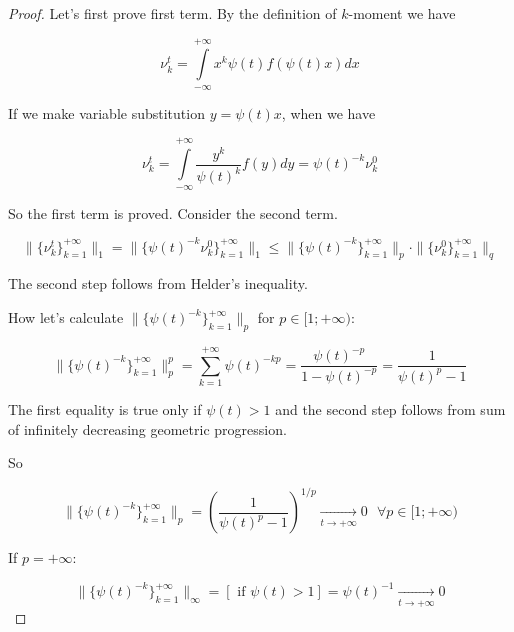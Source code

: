 \documentclass{article}
\begin{document}
    \begin{proof}
        Let's first prove first term. By the definition of $k$-moment we have

        \begin{equation*}
            \nu_k^t = \int\limits_{-\infty}^{+\infty} x^k \psi(t) f(\psi(t) x) dx
        \end{equation*}

        If we make variable substitution $y = \psi(t) x$, when we have

        \begin{equation*}
            \nu_k^t = \int\limits_{-\infty}^{+\infty} \dfrac{y^k}{\psi(t)^k} f(y) dy = \psi(t)^{-k} \nu_k^0
        \end{equation*}

        So the first term is proved. Consider the second term.

        \begin{equation*}
            \|\{\nu_k^t\}_{k=1}^{+\infty}\|_1 = \|\{\psi(t)^{-k} \nu_k^0\}_{k=1}^{+\infty}\|_1 \leq \|\{\psi(t)^{-k}\}_{k=1}^{+\infty}\|_p \cdot \|\{\nu_k^0\}_{k=1}^{+\infty}\|_q
        \end{equation*}

        The second step follows from Helder's inequality.

        How let's calculate $\|\{\psi(t)^{-k}\}_{k=1}^{+\infty}\|_p$ for $p \in [1; +\infty)$:

        \begin{equation*}
            \|\{\psi(t)^{-k}\}_{k=1}^{+\infty}\|_p^p = \sum\limits_{k=1}^{+\infty}\psi(t)^{-kp} = \dfrac{\psi(t)^{-p}}{1 - \psi(t)^{-p}} = \dfrac{1}{\psi(t)^p - 1}
        \end{equation*}

        The first equality is true only if $\psi(t) > 1$ and the second step follows from sum of infinitely decreasing geometric progression.

        So

        \begin{equation*}
            \|\{\psi(t)^{-k}\}_{k=1}^{+\infty}\|_p = \left( \dfrac{1}{\psi(t)^p - 1} \right)^{1/p} \underset{t \to +\infty}{\longrightarrow} 0 ~~~\forall p \in [1; +\infty)
        \end{equation*}

        If $p = +\infty$:

        \begin{equation*}
            \|\{\psi(t)^{-k}\}_{k=1}^{+\infty}\|_{\infty} = \left[ \text{ if } \psi(t) > 1 \right] = \psi(t)^{-1} \underset{t \to +\infty}{\longrightarrow} 0
        \end{equation*}


\end{proof}
\end{document}
